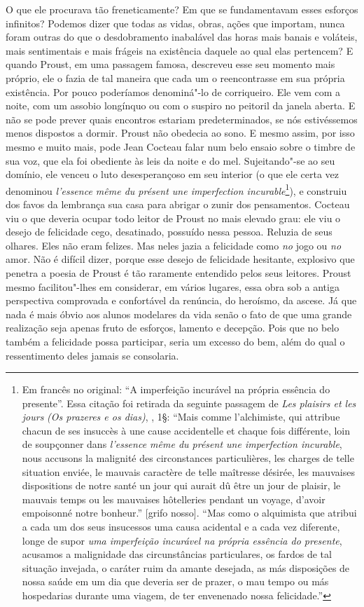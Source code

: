 O que ele procurava tão freneticamente? Em que se fundamentavam esses
esforços infinitos? Podemos dizer que todas as vidas, obras, ações que
importam, nunca foram outras do que o desdobramento inabalável das horas
mais banais e voláteis, mais sentimentais e mais frágeis na existência
daquele ao qual elas pertencem? E quando Proust, em uma passagem famosa,
descreveu esse seu momento mais próprio, ele o fazia de tal maneira que
cada um o reencontrasse em sua própria existência. Por pouco poderíamos
denominá"-lo de corriqueiro. Ele vem com a noite, com um assobio
longínquo ou com o suspiro no peitoril da janela aberta. E não se pode
prever quais encontros estariam predeterminados, se nós
estivéssemos menos dispostos a dormir. Proust não obedecia ao sono. E
mesmo assim, por isso mesmo e muito mais, pode Jean Cocteau falar num
belo ensaio sobre o timbre de sua voz, que ela foi obediente às leis da
noite e do mel. Sujeitando"-se ao seu domínio, ele venceu o luto
desesperançoso em seu interior (o que ele certa vez denominou
\emph{l'essence même du présent une imperfection incurable}\footnote{Em francês no original: ``A imperfeição incurável na própria essência
  do presente''. Essa citação foi retirada da seguinte passagem de
  \emph{Les plaisirs et les jours} \emph{(Os prazeres e os dias)}, ,
  1§: ``Mais comme l'alchimiste, qui attribue chacun de ses insuccès à
  une cause accidentelle et chaque fois différente, loin de soupçonner
  dans \emph{l'essence même du présent une imperfection incurable}, nous
  accusons la malignité des circonstances particulières, les charges de
  telle situation enviée, le mauvais caractère de telle maîtresse
  désirée, les mauvaises dispositions de notre santé un jour qui aurait
  dû être un jour de plaisir, le mauvais temps ou les mauvaises
  hôtelleries pendant un voyage, d'avoir empoisonné notre bonheur.''
  {[}grifo nosso{]}. ``Mas como o alquimista que atribui a cada um dos
  seus insucessos uma causa acidental e a cada vez diferente, longe de
  supor \emph{uma imperfeição incurável na própria essência do
  presente}, acusamos a malignidade das circunstâncias particulares, os
  fardos de tal situação invejada, o caráter ruim da amante desejada, as
  más disposições de nossa saúde em um dia que deveria ser de prazer, o
  mau tempo ou más hospedarias durante uma viagem, de ter envenenado
  nossa felicidade.'' \versal{[N.~T.]}}), e construiu dos favos da lembrança sua casa
para abrigar o zunir dos pensamentos. Cocteau viu o que deveria ocupar
todo leitor de Proust no mais elevado grau: ele viu o desejo de
felicidade cego, desatinado, possuído nessa pessoa. Reluzia de seus
olhares. Eles não eram felizes. Mas neles jazia a felicidade como
\emph{no} jogo ou \emph{no} amor. Não é difícil dizer, porque esse
desejo de felicidade hesitante, explosivo que penetra a poesia de
Proust é tão raramente entendido pelos seus leitores. Proust mesmo
facilitou"-lhes em considerar, em vários lugares, essa obra sob a
antiga perspectiva comprovada e confortável da renúncia, do heroísmo, da
ascese. Já que nada é mais óbvio aos alunos modelares da vida senão o
fato de que uma grande realização seja apenas fruto de esforços, lamento
e decepção. Pois que no belo também a felicidade possa participar, seria
um excesso do bem, além do qual o ressentimento deles jamais se
consolaria.

